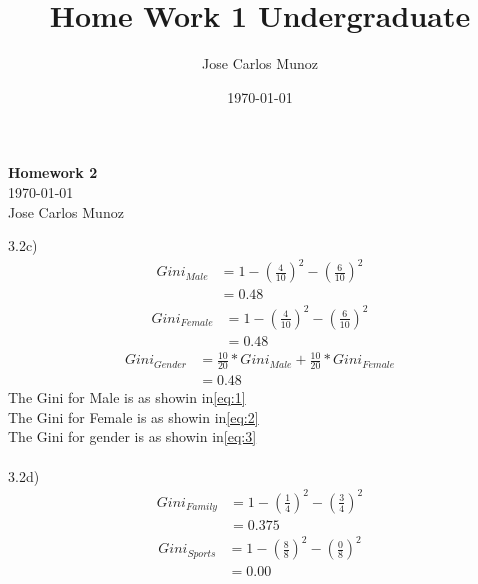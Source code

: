\documentclass[12pt,english]{article}
\title{Home Work 1 Undergraduate}
\date{\today}
\author{Jose Carlos Munoz}
\begin{document}
\begin{center}
    \Large
    \textbf{Homework 2}\\
    \small
    \today\\
    \large
    Jose Carlos Munoz
\end{center}%
3.2c)\\
\begin{equation}\tag{1}\label{eq:1}
\begin{split}
Gini_{Male} &= 1- (\frac{4}{10})^{2} - (\frac{6}{10})^{2}\\
&=0.48
\end{split}
\end{equation}
\begin{equation}\tag{2}\label{eq:2}
\begin{split}
Gini_{Female} &= 1- (\frac{4}{10})^{2} - (\frac{6}{10})^{2}\\
&=0.48
\end{split}
\end{equation}
\begin{equation}\tag{3}\label{eq:3}
\begin{split}
Gini_{Gender} &= \frac{10}{20}*Gini_{Male} + \frac{10}{20}*Gini_{Female}\\
&=0.48
\end{split}
\end{equation}
The Gini for Male is as showin in\eqref{eq:1}\\
The Gini for Female is as showin in\eqref{eq:2}\\
The Gini for gender is as showin in\eqref{eq:3}\\ \\
3.2d)\\
\begin{equation}\tag{1}\label{eq:4}
\begin{split}
Gini_{Family} &= 1- (\frac{1}{4})^{2} - (\frac{3}{4})^{2}\\
&=0.375
\end{split}
\end{equation}
\begin{equation}\tag{2}\label{eq:5}
\begin{split}
Gini_{Sports} &= 1- (\frac{8}{8})^{2} - (\frac{0}{8})^{2}\\
&=0.00
\end{split}
\end{equation}
\end{document}
